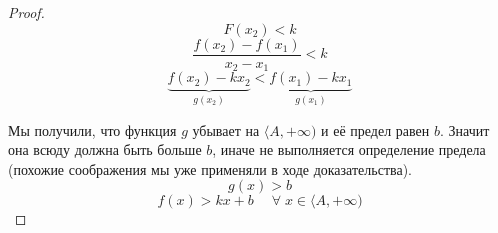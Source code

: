 \documentclass[../main.tex]{subfiles}
\begin{document}
\begin{proof}
    \[ F(x_2) < k\]
    \[ \dfrac{ f(x_2)-f(x_1)}{ x_2-x_1}<k\]
    \[ \underbrace{f(x_2)-kx_2}_{g(x_2)}<\underbrace{f(x_1)-kx_1}_{g(x_1)}\]

    Мы получили, что функция \( g\) убывает на \( \langle A, + \infty )\) и её предел равен \( b\). Значит она всюду должна быть больше \( b\), иначе не выполняется определение предела (похожие соображения мы уже применяли в ходе доказательства). 
    \[ g(x)>b\]
    \[ f(x) > kx+b\quad\;  \forall \; x \in \langle A, + \infty )\]
\end{proof}
\end{document}
